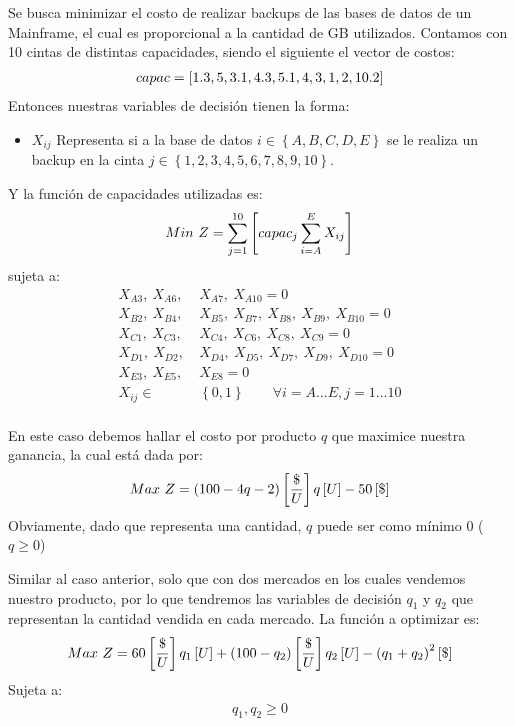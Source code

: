 \documentclass{tarea}
\begin{document}
\begin{homeworkProblem}
Se busca minimizar el costo de realizar backups de las bases de datos de un Mainframe, el cual es proporcional a la cantidad de GB utilizados.
Contamos con 10 cintas de distintas capacidades, siendo el siguiente el vector de costos:
\begin{align*}
capac = \left[ 1.3, 5, 3.1, 4.3, 5.1, 4, 3, 1, 2, 10.2 \right]
\end{align*}
Entonces nuestras variables de decisión tienen la forma:
\begin{itemize}
\item $X_{ij}$ Representa si a la base de datos \( i \in \left\{ A,B,C,D,E \right\}  \) se le realiza un backup en la cinta \(  j \in \left\{ 1,2,3,4,5,6,7,8,9,10 \right\} \).
\end{itemize}
Y la función de capacidades utilizadas es:
\begin{align*}
Min\ Z = \sum_{j=1}^{10}{\left[ capac_j \sum_{i=A}^{E}{X_{ij}} \right]}
\end{align*}
sujeta a:
\begin{align*}
X_{A3},\    X_{A6},\ &  X_{A7},\   X_{A10} = 0  \\
X_{B2},\   X_{B4},\  &X_{B5},\  X_{B7},\  X_{B8},\   X_{B9},\  X_{B10} = 0 \\
X_{C1},\   X_{C3},\  &X_{C4},\  X_{C6},\  X_{C8},\  X_{C9} =0 \\
X_{D1},\   X_{D2},\  &X_{D4},\  X_{D5},\  X_{D7},\  X_{D9},\  X_{D10} = 0 \\
X_{E3},\   X_{E5},\  &X_{E8}  = 0 \\
X_{ij} \in & \left\{  0,1 \right\}\quad\quad \forall i=A...E,j=1...10\\
\end{align*}
\end{homeworkProblem}


\begin{homeworkProblem}[-1][Monopolista]
En este caso debemos hallar el costo por producto $q$ que maximice nuestra ganancia, la cual está dada por:
\begin{equation}
  Max\ Z = \left( 100-4q-2 \right)\left[ \frac{\$}{U} \right]q\left[ U \right] -50\left[ \$ \right] 
\end{equation}
Obviamente, dado que representa una cantidad, $q$ puede ser como mínimo 0 ($q \ge 0$)
\end{homeworkProblem}


\begin{homeworkProblem}
Similar al caso anterior, solo que con dos mercados en los cuales vendemos nuestro producto, por lo que tendremos las variables de decisión
$q_1$ y $q_2$ que representan la cantidad vendida en cada mercado. La función a optimizar es:
\begin{equation}
  Max\ Z = 60\left[ \frac{\$}{U} \right]q_1\left[ U \right] + \left( 100-q_2 \right)\left[ \frac{\$}{U} \right]q_2\left[ U \right] - \left( q_1 + q_2 \right)^2\left[ \$ \right]
\end{equation}
Sujeta a:
\begin{align*}
  q_1,q_2\ge 0
\end{align*}
\end{homeworkProblem}
\end{document}
